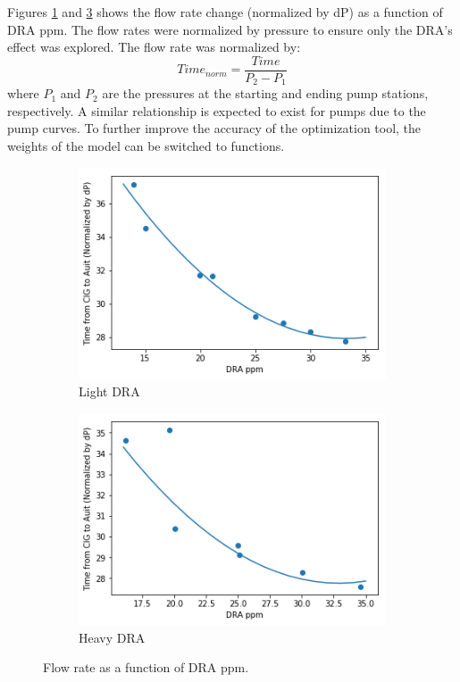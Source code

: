 Figures \ref{fig:08light_dra_curve} and \ref{fig:08heavy_dra_curve} shows the flow rate change (normalized by dP) as a function of DRA ppm. The flow rates were normalized by pressure to ensure only the DRA's effect was explored.  The flow rate was normalized by:
\begin{equation}
    Time_{norm} = \frac{Time}{P_2 - P_1}
\end{equation}
where $P_1$ and $P_2$ are the pressures at the starting and ending pump stations, respectively. A similar relationship is expected to exist for pumps due to the pump curves.  To further improve the accuracy of the optimization tool, the weights of the model can be switched to functions.  
\begin{figure}
    \centering
    \begin{subfigure}[b]{0.48\textwidth}
        \includegraphics[width=\textwidth]{images/suncor/08Sweet_dra_curve.png}
        \caption{Light DRA}
        \label{fig:08light_dra_curve}
    \end{subfigure}
    \begin{subfigure}[b]{0.48\textwidth}
        \includegraphics[width=\textwidth]{images/suncor/08Sour_dra_curve.png}
        \caption{Heavy DRA}
        \label{fig:08heavy_dra_curve}
    \end{subfigure}
        \caption{Flow rate as a function of DRA ppm.}
\end{figure}

